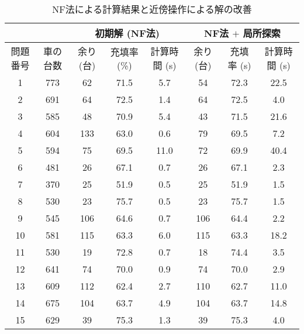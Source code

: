 \begin{table}[H]
    \centering
    \caption{NF法による計算結果と近傍操作による解の改善}
    \label{review-local-nf}
    \begin{tabular}{cccccccc}
    \hline
        & & \multicolumn{3}{c}{初期解 (NF法)} & \multicolumn{3}{c}{NF法 $+$ 局所探索} \\
    \hline
    問題番号 & 車の台数  & 余り (台)  & 充填率 (\%) & 計算時間 (s) & 余り (台)  & 充填率 (s)  & 計算時間 (s)  \\
    \hline
    1    & 773  & 62      & 71.5     &  5.7     & 54      & 72.3     & 22.5       \\
    2    & 691  & 64      & 72.5     &  1.4     & 64      & 72.5     & 4.0      \\
    3    & 585  & 48      & 70.9     &  5.4     & 43      & 71.5     & 21.6       \\
    4    & 604  & 133     & 63.0     &  0.6     & 79      & 69.5     & 7.2      \\
    5    & 594  & 75      & 69.5     &  11.0    & 72      & 69.9     & 40.4       \\
    6    & 481  & 26      & 67.1     & 0.7      & 26      & 67.1     & 2.3          \\
    7    & 370  & 25      & 51.9     & 0.5      & 25      & 51.9     & 1.5       \\
    8    & 530  & 23      & 75.7     & 0.5      & 23      & 75.7     & 1.5       \\
    9    & 545  & 106     & 64.6     & 0.7      & 106     & 64.4     & 2.2        \\
    10   & 581  & 115     & 63.3     & 6.0      & 115     & 63.3     & 18.2       \\
    11   & 530  & 19      & 72.8     & 0.7      & 18      & 74.4     & 3.5      \\
    12   & 641  & 74      & 70.0     & 0.9      & 74      & 70.0     & 2.9       \\
    13   & 609  & 112     & 62.4     & 2.7      & 110     & 62.7     & 11.0       \\
    14   & 675  & 104     & 63.7     & 4.9      & 104     & 63.7     & 14.8      \\
    15   & 629  & 39      & 75.3     & 1.3      & 39      & 75.3     & 4.0      \\
    \hline
    \end{tabular}
\end{table}

\clearpage

